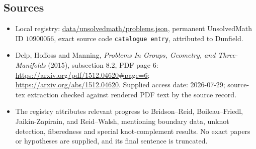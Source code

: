 \documentclass[11pt]{article}
\begin{document}
\subsection{Sources}
\begin{itemize}
\item Local registry: \url{data/unsolvedmath/problems.json}, permanent UnsolvedMath ID $10900056$, exact source code \texttt{catalogue entry}, attributed to Dunfield.
\item Delp, Hoffoss and Manning, \emph{Problems In Groups, Geometry, and Three-Manifolds} (2015), subsection 8.2, PDF page 6: \url{https://arxiv.org/pdf/1512.04620#page=6}; \url{https://arxiv.org/abs/1512.04620}. Supplied access date: 2026-07-29; source-tex extraction checked against rendered PDF text by the source record.
\item The registry attributes relevant progress to Bridson--Reid, Boileau--Friedl, Jaikin-Zapirain, and Reid--Walsh, mentioning boundary data, unknot detection, fiberedness and special knot-complement results. No exact papers or hypotheses are supplied, and its final sentence is truncated.
\end{itemize}
\end{document}

